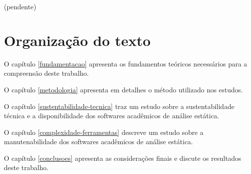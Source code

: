 (pendente)

\section{Organização do texto}

O capítulo \ref{fundamentacao} apresenta os fundamentos teóricos necessários
para a compreensão deste trabalho.

O capítulo \ref{metodologia} apresenta em detalhes o método utilizado nos
estudos.

O capítulo \ref{sustentabilidade-tecnica} traz um estudo sobre a
sustentabilidade técnica e a disponibilidade dos softwares acadêmicos de
análise estática.

O capítulo \ref{complexidade-ferramentas} descreve um estudo sobre a
manutenabilidade dos softwares acadêmicos de análise estática.

O capítulo \ref{conclusoes} apresenta as considerações finais e discute os
resultados deste trabalho.
